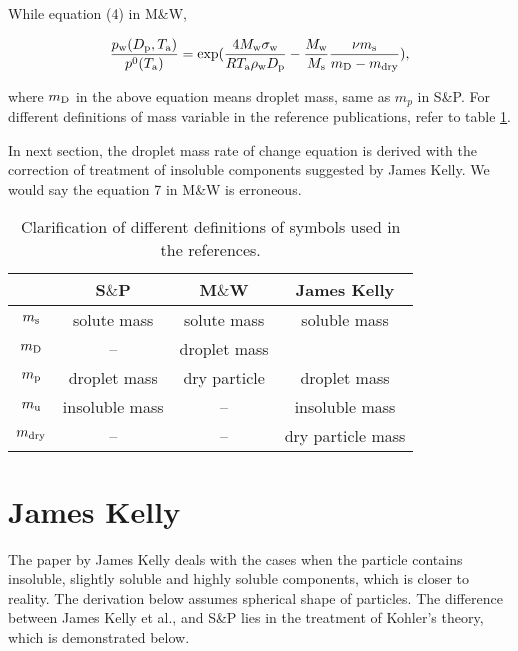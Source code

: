 \documentclass[12pt]{article}
\begin{document}
While equation (4) in M\&W, 

\begin{equation}
\frac{p_{\rm w}(D_{\rm p}, T_{\rm a})}{p^{\rm 0}(T_{\rm a})}=\exp(\frac{4 M_{\rm w} \sigma_{\rm w}}{R T_{\rm a} \rho_{\rm w} D_{\rm p}}-\frac{M_{\rm w}}{M_{\rm s}}\frac{\nu m_{\rm s}}{m_{\rm D}-m_{\rm dry}}),
\end{equation}

where $m_{\rm D}$ in the above equation means droplet mass, same as $m_{p}$ in S\&P. For different definitions of mass variable in the reference publications, refer to table \ref{table:1}. 

In next section, the droplet mass rate of change equation is derived with the correction of treatment of insoluble components suggested by James Kelly. We would say the equation 7 in M\&W is erroneous.



\begin{table}\label{table:1}
\caption{Clarification of different definitions of symbols used in the references.}
\begin{center}
\begin{tabular}{cccc} \hline
   & S$\&$P  &  M$\&$W   & James Kelly \\ \hline
$m_{\rm s}$  &   solute mass  & solute mass  &   soluble mass \\ 
$m_{\rm D}$  & --  &  droplet mass  &   \\ 
$m_{\rm p}$  & droplet mass  &  dry particle &  droplet mass \\ 
$m_{\rm u}$  & insoluble mass  & -- & insoluble mass \\ 
$m_{\rm dry}$ &  -- & -- & dry particle mass \\ \hline
\end{tabular}
\end{center}
\end{table}


\section{James Kelly}

The paper by James Kelly deals with the cases when the particle contains insoluble, slightly soluble and  highly soluble components, which is closer to reality. The derivation below assumes spherical shape of particles. The difference between James Kelly et al., and S\&P lies in the treatment of Kohler's theory, which is demonstrated below.
\end{document}
